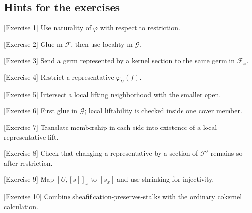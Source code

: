 \subsection*{Hints for the exercises}
\begin{hint}
[Exercise 1]
Use naturality of $\varphi$ with respect to restriction.
\end{hint}

\begin{hint}
[Exercise 2]
Glue in $\mathcal F$, then use locality in $\mathcal G$.
\end{hint}

\begin{hint}
[Exercise 3]
Send a germ represented by a kernel section to the same germ in $\mathcal F_x$.
\end{hint}

\begin{hint}
[Exercise 4]
Restrict a representative $\varphi_U(f)$.
\end{hint}

\begin{hint}
[Exercise 5]
Intersect a local lifting neighborhood with the smaller open.
\end{hint}

\begin{hint}
[Exercise 6]
First glue in $\mathcal G$; local liftability is checked inside one cover member.
\end{hint}

\begin{hint}
[Exercise 7]
Translate membership in each side into existence of a local representative lift.
\end{hint}

\begin{hint}
[Exercise 8]
Check that changing a representative by a section of $\mathcal F'$ remains so after restriction.
\end{hint}

\begin{hint}
[Exercise 9]
Map $[U,[s]]_x$ to $[s_x]$ and use shrinking for injectivity.
\end{hint}

\begin{hint}
[Exercise 10]
Combine sheafification-preserves-stalks with the ordinary cokernel calculation.
\end{hint}


